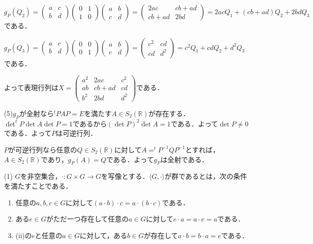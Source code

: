 \documentclass[
		book,
		head_space=20mm,
		foot_space=20mm,
		gutter=10mm,
		line_length=190mm
]{jlreq}
\begin{document}
    $g_P(Q_2)=\begin{pmatrix}
        a & c\\
        b & d
    \end{pmatrix}\begin{pmatrix}
        0 & 1\\
        1 & 0
    \end{pmatrix}\begin{pmatrix}
        a & b\\
        c & d
        \end{pmatrix}=\begin{pmatrix}
            2ac & cb+ad\\
            cb+ad & 2bd
        \end{pmatrix}=2acQ_1+(cb+ad)Q_2+2bdQ_3$である．

    $g_P(Q_3)=\begin{pmatrix}
        a & c\\
        b & d
    \end{pmatrix}\begin{pmatrix}
        0 & 0\\
        0 & 1
    \end{pmatrix}\begin{pmatrix}
        a & b\\
        c & d
    \end{pmatrix}=\begin{pmatrix}
        c^2 & cd\\
        cd & d^2
    \end{pmatrix}=c^2Q_1+cdQ_2+d^2Q_3$である．

    よって表現行列は$X=\begin{pmatrix}
        a^2 & 2ac & c^2\\
        ab & cb+ad & cd\\
        b^2 & 2bd & d^2
    \end{pmatrix}$である．

(5)$g_P$が全射なら$^tPAP=E$を満たす$A \in S_2(\mathbb{R})$が存在する．$\det ^tP \det A \det P= 1$であるから$(\det P)^2 \det A=1$である．よって$\det P \neq 0$である．よって$P$は可逆行列．

$P$が可逆行列なら任意の$Q \in S_2(\mathbb{R})$に対して$A=^tP^{-1}QP^{-1}$とすれば，$A \in S_2(\mathbb{R})$であり，$g_P(A)=Q$である．よって$g_P$は全射である．

(1)
$G$を非空集合，$\cdot :G \times G \to G$を写像とする．$\langle G,\cdot \rangle$が群であるとは，次の条件を満たすことである．
\begin{enumerate}[label=(\roman*)]
    \item 任意の$a,b,c \in G$に対して$(a\cdot b)\cdot c=a\cdot (b\cdot c)$である． 
    \item ある$e \in G$がただ一つ存在して任意の$a \in G$に対して$e\cdot a=a\cdot e=a$である．
    \item (ii)の$e$と任意の$a \in G$に対して，ある$b \in G$が存在して$a\cdot b=b\cdot a=e$である．
\end{enumerate}
\end{document}
